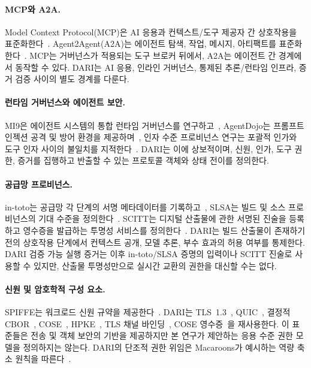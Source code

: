 \documentclass[10pt]{article}
\newcommand{\dariname}{DARI}
\begin{document}
\paragraph{MCP와 A2A.}
Model Context Protocol(MCP)은 AI 응용과 컨텍스트/도구 제공자 간 상호작용을 표준화한다~\cite{mcp2025}. Agent2Agent(A2A)는 에이전트 탐색, 작업, 메시지, 아티팩트를 표준화한다~\cite{a2a2026}. MCP는 거버넌스가 적용되는 도구 브로커 뒤에서, A2A는 에이전트 간 경계에서 동작할 수 있다. \dariname{}는 AI 응용, 인라인 거버넌스, 통제된 추론/런타임 인프라, 증거 검증 사이의 별도 경계를 다룬다.

\paragraph{런타임 거버넌스와 에이전트 보안.}
MI9은 에이전트 시스템의 통합 런타임 거버넌스를 연구하고~\cite{wang2025mi9}, AgentDojo는 프롬프트 인젝션 공격 및 방어 환경을 제공하며~\cite{debenedetti2024agentdojo}, 인자 수준 프로비넌스 연구는 포괄적 인가와 도구 인자 사이의 불일치를 지적한다~\cite{fan2026granularity}. \dariname{}는 이에 상보적이며, 신원, 인가, 도구 권한, 증거를 집행하고 반출할 수 있는 프로토콜 객체와 상태 전이를 정의한다.

\paragraph{공급망 프로비넌스.}
in-toto는 공급망 각 단계의 서명 메타데이터를 기록하고~\cite{torresarias2019intoto,intoto}, SLSA는 빌드 및 소스 프로비넌스의 기대 수준을 정의한다~\cite{slsa12}. SCITT는 디지털 산출물에 관한 서명된 진술을 등록하고 영수증을 발급하는 투명성 서비스를 정의한다~\cite{rfc9943}. \dariname{}는 빌드 산출물이 존재하기 전의 상호작용 단계에서 컨텍스트 공개, 모델 추론, 부수 효과의 허용 여부를 통제한다. DARI 검증 가능 실행 증거는 이후 in-toto/SLSA 증명의 입력이나 SCITT 진술로 사용할 수 있지만, 산출물 투명성만으로 실시간 교환의 권한을 대신할 수는 없다.

\paragraph{신원 및 암호학적 구성 요소.}
SPIFFE는 워크로드 신원 규약을 제공한다~\cite{spiffe}. \dariname{}는 TLS~1.3~\cite{rfc9846}, QUIC~\cite{rfc9000}, 결정적 CBOR~\cite{rfc8949}, COSE~\cite{rfc9052}, HPKE~\cite{rfc9180}, TLS 채널 바인딩~\cite{rfc9266}, COSE 영수증~\cite{rfc9942}을 재사용한다. 이 표준들은 전송 및 객체 보안의 기반을 제공하지만 본 연구가 제안하는 응용 수준 권한 모델을 정의하지는 않는다. DARI의 단조적 권한 위임은 Macaroons가 예시하는 역량 축소 원칙을 따른다~\cite{birgisson2014macaroons}.
\end{document}
